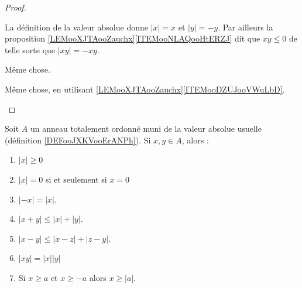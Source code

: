\begin{proof}
\begin{subproof}
\begin{subproof}
			La définition de la valeur absolue donne \( | x |=x\) et \( | y |=-y\). Par ailleurs la proposition \ref{LEMooXJTAooZauchx}\ref{ITEMooNLAQooHtERZJ} dit que \( xy\leq 0\) de telle sorte que \( | xy |=-xy\).

			Même chose.

			\spitem[Si \( x,y\leq 0\)]
			Même chose, en utilisant \ref{LEMooXJTAooZauchx}\ref{ITEMooDZUJooVWuLbD}.
		\end{subproof}
	\end{subproof}
\end{proof}



\begin{lemma}  \label{LemooANTJooYxQZDw}
	Soit \( A \) un anneau totalement ordonné muni de la valeur absolue usuelle (définition \ref{DEFooJXKVooErANPh}). Si \( x,y\in A\),  alors :
	\begin{enumerate}
		\item       \label{ITEMooSDNHooDnjScE}
		      \( | x |\geq 0\)
		\item       \label{ITEMooLQLTooTJTPVM}
		      \( | x |=0\) si et seulement si \( x=0\)
		\item       \label{ITEMooVJAEooOEatzY}
		      \( | -x |=| x |\).
		\item			\label{ItemooOMKNooRlanvk}
		      \( | x+y |\leq | x |+| y |\).
		\item		\label{ITEMooISWFooMeOtjZ}
		      \( | x-y |\leq | x-z |+| z-y |\).
		\item		\label{ITEMooEFMLooYVCuHD}
		      \( | xy |=| x | |y |\)
		\item		\label{ITEMooLWPTooEvHzvO}
		      Si \( x\geq a\) et \( x\geq -a\) alors \( x\geq | a |\).
	\end{enumerate}
\end{lemma}

